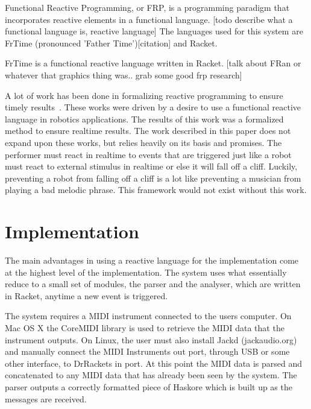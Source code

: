 \documentclass[12pt]{ucthesis}
\begin{document}
{Functional Reactive Programming, or FRP, is a programming paradigm that incorporates reactive elements in a functional language. [todo describe what a functional language is, reactive language] The languages used for this system are FrTime (pronounced 'Father Time')[citation] and Racket. 

FrTime is a functional reactive language written in Racket. [talk about FRan or whatever that graphics thing was.. grab some good frp research]

A lot of work has been done in formalizing reactive programming to ensure timely results~\cite{EventDriven}\cite{RealTime}. These works were driven by a desire to use a functional reactive language in robotics applications. The results of this work was a formalized method to ensure realtime results. The work described in this paper does not expand upon these works, but relies heavily on its basis and promises. The performer must react in realtime to events that are triggered just like a robot must react to external stimulus in realtime or else it will fall off a cliff. Luckily, preventing a robot from falling off a cliff is a lot like preventing a musician from playing a bad melodic phrase. This framework would not exist without this work.

\chapter{Implementation}
\label{Implementation}
The main advantages in using a reactive language for the implementation come at the highest level of the implementation. The system uses what essentially reduce to a small set of modules, the parser and the analyser, which are written in Racket, anytime a new event is triggered. 

The system requires a MIDI instrument connected to the users computer. On Mac OS X the CoreMIDI library is used to retrieve the MIDI data that the instrument outputs. On Linux, the user must also install Jackd (jackaudio.org) and manually connect the MIDI Instruments out port, through USB or some other interface, to DrRackets in port. At this point the MIDI data is parsed and concatenated to any MIDI data that has already been seen by the system. The parser outputs a correctly formatted piece of Haskore which is built up as the messages are received. 

}
\end{document}
